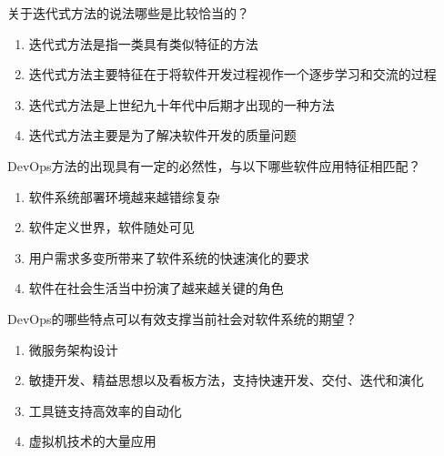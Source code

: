 \begin{problem}
    ‌关于迭代式方法的说法哪些是比较恰当的？
        \begin{enumerate}[label=\Alph*.]
            \item 迭代式方法是指一类具有类似特征的方法
            \item 迭代式方法主要特征在于将软件开发过程视作一个逐步学习和交流的过程
            \item 迭代式方法是上世纪九十年代中后期才出现的一种方法
            \item 迭代式方法主要是为了解决软件开发的质量问题
        \end{enumerate}
\end{problem}



\begin{problem}
    DevOps方法的出现具有一定的必然性，与以下哪些软件应用特征相匹配？
        \begin{enumerate}[label=\Alph*.]
            \item 软件系统部署环境越来越错综复杂
            \item 软件定义世界，软件随处可见
            \item 用户需求多变所带来了软件系统的快速演化的要求
            \item 软件在社会生活当中扮演了越来越关键的角色
        \end{enumerate}
\end{problem}



\begin{problem}
    DevOps的哪些特点可以有效支撑当前社会对软件系统的期望？
        \begin{enumerate}[label=\Alph*.]
            \item 微服务架构设计
            \item 敏捷开发、精益思想以及看板方法，支持快速开发、交付、迭代和演化
            \item 工具链支持高效率的自动化
            \item 虚拟机技术的大量应用
        \end{enumerate}
\end{problem}



